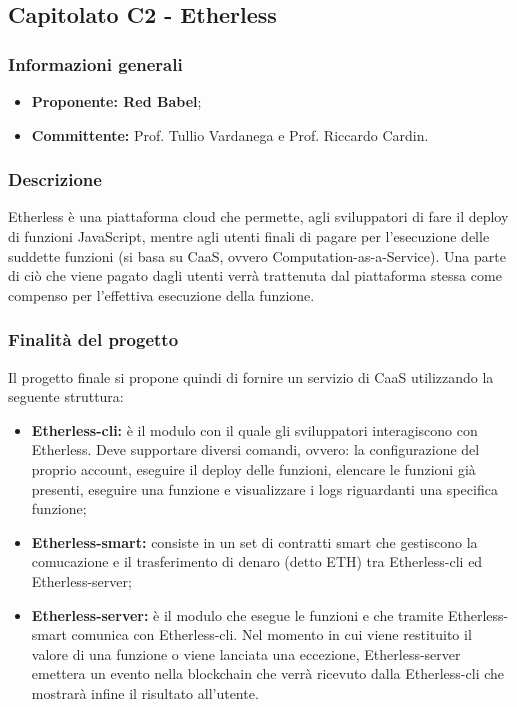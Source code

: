 \subsection{Capitolato C2 - Etherless}
	 \subsubsection{Informazioni generali}
       	\begin{itemize}
         	  \item \textbf{Proponente: Red Babel};
          	  \item \textbf{Committente: }Prof. Tullio Vardanega e Prof. Riccardo Cardin.
         \end{itemize}
	\subsubsection{Descrizione}
       Etherless è una piattaforma cloud che permette, agli sviluppatori di fare il deploy di funzioni JavaScript, mentre  agli utenti finali di pagare per l'esecuzione delle suddette funzioni (si basa su CaaS, ovvero Computation-as-a-Service).
       Una parte di ciò che viene pagato dagli utenti verrà trattenuta dal piattaforma stessa come compenso per l'effettiva esecuzione della funzione. 
    \subsubsection{Finalità del progetto}
     Il progetto finale si propone quindi di fornire un servizio di CaaS utilizzando la seguente struttura:
    		 \begin{itemize}
    			\item \textbf{Etherless-cli: }è il modulo con il quale gli sviluppatori interagiscono con Etherless. Deve supportare diversi comandi, ovvero: la configurazione del proprio account, eseguire il deploy delle funzioni, elencare le funzioni già presenti, eseguire una funzione e visualizzare i logs riguardanti una specifica funzione;
    			\item \textbf{Etherless-smart: }consiste in un set di contratti smart che gestiscono la comucazione e il trasferimento di denaro (detto ETH) tra Etherless-cli ed Etherless-server;
    			\item \textbf{Etherless-server: }è il modulo che esegue le funzioni e che tramite Etherless-smart comunica con Etherless-cli.  Nel momento in cui viene restituito il valore di una funzione o viene lanciata una eccezione, Etherless-server  emettera un evento nella blockchain che verrà ricevuto dalla Etherless-cli che mostrarà infine il risultato all'utente.
		\end{itemize}      
